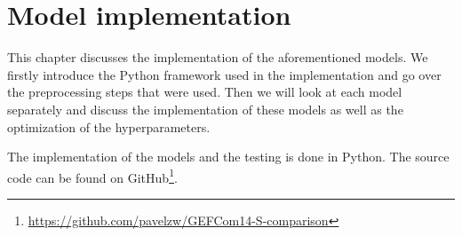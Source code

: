\chapter{Model implementation}
\label{ch:model-implementation}

This chapter discusses the implementation of the 
aforementioned models. We firstly introduce the 
Python framework used in the implementation and go 
over the preprocessing steps that were used. 
Then we will look at each model separately and discuss the implementation 
of these models as well as the optimization of the hyperparameters.

The implementation of the models and the testing is done in Python. 
The source code can be found on 
GitHub\footnote{\url{https://github.com/pavelzw/GEFCom14-S-comparison}}.









